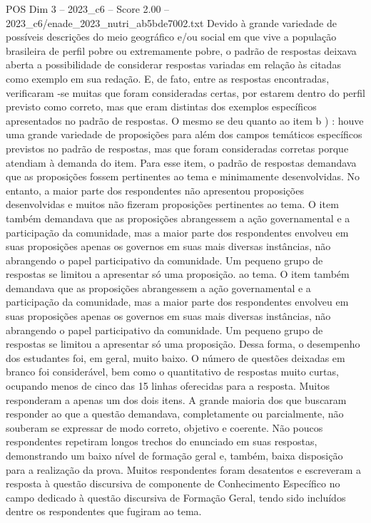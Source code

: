 \begin{textsample}{POS Dim 3 – 2023\_c6 – Score 2.00 – 2023\_c6/enade\_2023\_nutri\_ab5bde7002.txt}
Devido à grande variedade de possíveis descrições do meio geográfico e/ou social em que vive a população brasileira de perfil pobre ou extremamente pobre, o padrão de respostas deixava aberta a possibilidade de considerar respostas variadas em relação às citadas como exemplo em sua redação.
E, de fato, entre as respostas encontradas, verificaram -se muitas que foram consideradas certas, por estarem dentro do perfil previsto como correto, mas que eram distintas dos exemplos específicos apresentados no padrão de respostas.
O mesmo se deu quanto ao item b ) : houve uma grande variedade de proposições para além dos campos temáticos específicos previstos no padrão de respostas, mas que foram consideradas corretas porque atendiam à demanda do item.
Para esse item, o padrão de respostas demandava que as proposições fossem pertinentes ao tema e minimamente desenvolvidas.
No entanto, a maior parte dos respondentes não apresentou proposições desenvolvidas e muitos não fizeram proposições pertinentes ao tema.
O item também demandava que as proposições abrangessem a ação governamental e a participação da comunidade, mas a maior parte dos respondentes envolveu em suas proposições apenas os governos em suas mais diversas instâncias, não abrangendo o papel participativo da comunidade.
Um pequeno grupo de respostas se limitou a apresentar só uma proposição. ao tema.
O item também demandava que as proposições abrangessem a ação governamental e a participação da comunidade, mas a maior parte dos respondentes envolveu em suas proposições apenas os governos em suas mais diversas instâncias, não abrangendo o papel participativo da comunidade.
Um pequeno grupo de respostas se limitou a apresentar só uma proposição.
Dessa forma, o desempenho dos estudantes foi, em geral, muito baixo.
O número de questões deixadas em branco foi considerável, bem como o quantitativo de respostas muito curtas, ocupando menos de cinco das 15 linhas oferecidas para a resposta.
Muitos responderam a apenas um dos dois itens.
A grande maioria dos que buscaram responder ao que a questão demandava, completamente ou parcialmente, não souberam se expressar de modo correto, objetivo e coerente.
Não poucos respondentes repetiram longos trechos do enunciado em suas respostas, demonstrando um baixo nível de formação geral e, também, baixa disposição para a realização da prova.
Muitos respondentes foram desatentos e escreveram a resposta à questão discursiva de componente de Conhecimento Específico no campo dedicado à questão discursiva de Formação Geral, tendo sido incluídos dentre os respondentes que fugiram ao tema.

\end{textsample}
